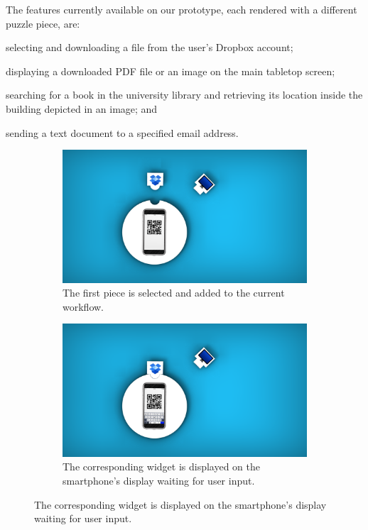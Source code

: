 The features currently available on our prototype, each rendered with a different puzzle piece, are:
\begin{enumerate*}[label=(\arabic*)]
  \item selecting and downloading a file from the user's Dropbox account;
  \item displaying a downloaded PDF file or an image on the main tabletop screen;
  \item searching for a book in the university library and retrieving its location inside the building depicted in an image; and
  \item sending a text document to a specified email address.
\end{enumerate*}

\begin{figure}[ht!] 
  \begin{subfigure}[b]{0.48\linewidth}
    \centering
    \includegraphics[width=0.75\linewidth,trim={800 200 1600 200},clip]{images/c4/TAPAS-1.png} 
    \caption{The first piece is selected and added to the current workflow.}\label{fig:walkthrough:a}
    \vspace{4ex}
  \end{subfigure}\hfill
  \begin{subfigure}[b]{0.48\linewidth}
    \centering
    \includegraphics[width=0.75\linewidth,trim={800 200 1600 200},clip]{images/c4/TAPAS-2.png} 
    \caption{The corresponding widget is displayed on the smartphone's display waiting for user input.}\label{fig:walkthrough:b}

\end{subfigure}
\end{figure}
